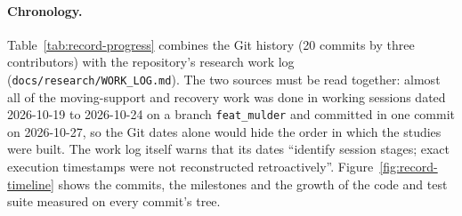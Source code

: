 \paragraph{Chronology.}
Table~\ref{tab:record-progress} combines the Git history (20 commits by three contributors) with
the repository's research work log (\texttt{docs/\allowbreak{}research/\allowbreak{}WORK\_\allowbreak{}LOG.md}). The two sources must be
read together: almost all of the moving-support and recovery work was done in working sessions
dated 2026-10-19 to 2026-10-24 on a branch \texttt{feat\_mulder} and committed in one commit on
2026-10-27, so the Git dates alone would hide the order in which the studies were built. The work log
itself warns that its dates ``identify session stages; exact execution timestamps were not
reconstructed retroactively''. Figure~\ref{fig:record-timeline} shows the commits, the milestones
and the growth of the code and test suite measured on every commit's tree.

